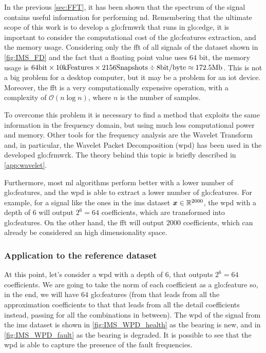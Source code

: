 In the previous \autoref{sec:FFT}, it has been shown that the spectrum of the signal contains useful information for performing \gls{nd}. Remembering that the ultimate scope of this work is to develop a \gls{glo:frmwrk} that runs in \gls{glo:edge}, it is important to consider the computational cost of the \gls{glo:feature}s extraction, and the memory usage. Considering only the \gls{fft} of all signals of the dataset shown in \autoref{fig:IMS_FD} and the fact that a floating point value uses $64$ bit, the memory usage is $64 \si{\bit} \times 10 \text{kFeatures} \times 2156 \text{Snapshots} \div 8 \text{bit/byte} \approx 172.5 \text{Mb}$. This is not a big problem for a desktop computer, but it may be a problem for an \gls{iot} device. Moreover, the \gls{fft} is a very computationally expensive operation, with a complexity of $\mathcal{O}(n \log n)$, where $n$ is the number of samples.

To overcome this problem it is necessary to find a method that exploits the same information in the frequency domain, but using much less computational power and memory. Other tools for the frequency analysis are the Wavelet Transform and, in particular, the Wavelet Packet Decomposition (\gls{wpd}) has been used in the developed \gls{glo:frmwrk}. The theory behind this topic is briefly described in \autoref{app:wavelet}.

Furthermore, most \gls{ml} algorithms perform better with a lower number of \gls{glo:feature}s, and the \gls{wpd} is able to extract a lower number of \gls{glo:feature}s. For example, for a signal like the ones in the \gls{ims} dataset $\bm{x} \in \mathbb{R}^{2000}$, the \gls{wpd} with a depth of $6$ will output $2^6=64$ coefficients, which are transformed into \gls{glo:feature}s. On the other hand, the \gls{fft} will output $2000$ coefficients, which can already be considered an high dimensionality space.

\subsubsection{Application to the reference dataset}

At this point, let's consider a \gls{wpd} with a depth of $6$, that outputs $2^6=64$ coefficients. We are going to take the norm of each coefficient as a \gls{glo:feature} so, in the end, we will have $64$ \gls{glo:feature}s (from  that leads from all the approximation coefficients to  that that leads from all the detail coefficients instead, passing for all the combinations in between). The \gls{wpd} of the  signal from the \gls{ims} dataset is shown in \autoref{fig:IMS_WPD_health} as the bearing is new, and in \autoref{fig:IMS_WPD_fault} as the bearing is degraded. It is possible to see that the \gls{wpd} is able to capture the presence of the fault frequencies.

